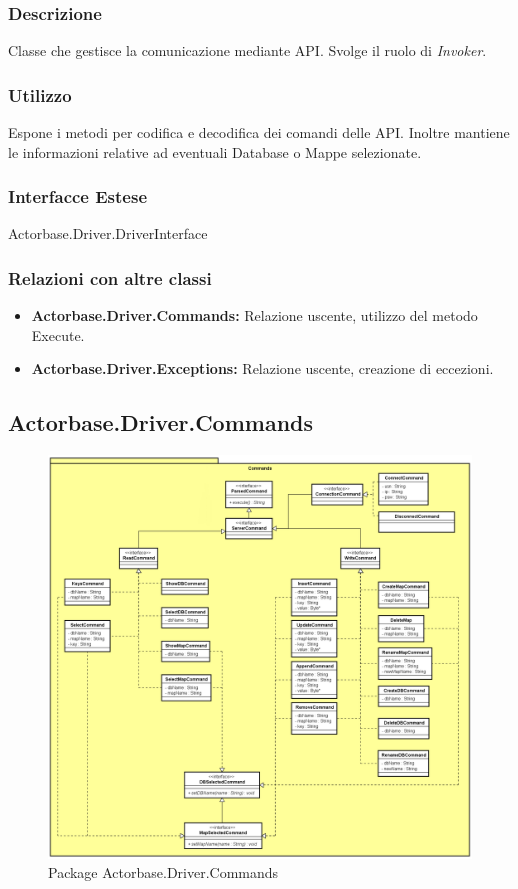 \documentclass[a4paper]{article}
\begin{document}
		\subsubsection{Descrizione}
			Classe che gestisce la comunicazione mediante API. Svolge il ruolo di \emph{Invoker}.
		\subsubsection{Utilizzo}
			Espone i metodi per codifica e decodifica dei comandi delle API. Inoltre mantiene le informazioni relative ad eventuali Database o Mappe selezionate.
		\subsubsection{Interfacce Estese}
			Actorbase.Driver.DriverInterface
		\subsubsection{Relazioni con altre classi}
		\begin{itemize}
			\item \textbf{Actorbase.Driver.Commands:} Relazione uscente, utilizzo del metodo Execute.
			\item \textbf{Actorbase.Driver.Exceptions:} Relazione uscente, creazione di eccezioni.
		\end{itemize}
		
		
	\subsection{Actorbase.Driver.Commands}
		\begin{figure} [H]
			\centering
			\includegraphics[scale=0.40]{ST/Client/CommandsClasses.png}
			\caption{Package Actorbase.Driver.Commands}
		\end{figure}
\end{document}
